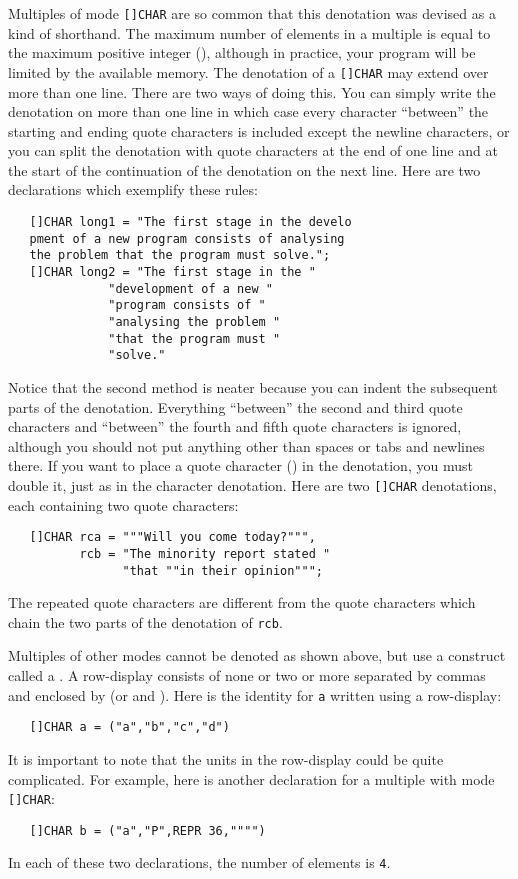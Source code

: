 Multiples of mode \verb|[]CHAR| are so common that this denotation
was devised as a kind of shorthand. The maximum number of elements in
a multiple is equal to the maximum positive integer (),
although in practice, your program will be limited by the available
memory.  The denotation of a \verb|[]CHAR| may extend over more than
one line. There are two ways of doing this. You can simply write the
denotation on more than one line in which case every character
``between'' the starting and ending quote characters is included
except the newline characters, or you can split the denotation with
quote characters at the end of one line and at the start of the
continuation of the denotation on the next line. Here are two
declarations which exemplify these rules:
\begin{verbatim}
   []CHAR long1 = "The first stage in the develo
   pment of a new program consists of analysing 
   the problem that the program must solve.";
   []CHAR long2 = "The first stage in the "
              "development of a new "
              "program consists of "
              "analysing the problem "
              "that the program must "
              "solve."
\end{verbatim}
\noindent
Notice that the second method is neater because you can indent the
subsequent parts of the denotation. Everything ``between'' the second
and third quote characters and ``between'' the fourth and fifth quote
characters is ignored, although you should not put anything other
than spaces or tabs and newlines there.  If you want to place a quote
character () in the denotation, you must double it, just as
in the character denotation.  Here are two \verb|[]CHAR| denotations,
each containing two quote characters:
\begin{verbatim}
   []CHAR rca = """Will you come today?""",
          rcb = "The minority report stated "
                "that ""in their opinion""";
\end{verbatim}
\noindent
The repeated quote characters are different from the quote characters
which chain the two parts of the denotation of \verb|rcb|.

Multiples of other modes cannot be denoted as shown above, but use a
construct called a .  A
row-display consists of none or two or more 
separated by commas and enclosed by  (or 
and ).  Here is the identity
 for
\verb|a| written using a row-display:
\begin{verbatim}
   []CHAR a = ("a","b","c","d")
\end{verbatim}
\noindent
It is important to note that the units in the row-display could be
quite complicated. For example, here is another declaration for a
multiple with mode \verb|[]CHAR|:
\begin{verbatim}
   []CHAR b = ("a","P",REPR 36,"""")
\end{verbatim}
\noindent
In each of these two declarations, the number of elements is \verb|4|.

